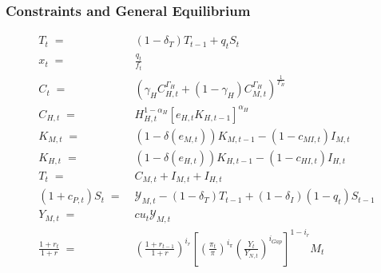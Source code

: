 \documentclass[12pt,3p,authoryear,review]{elsarticle}
\begin{document}
\subsubsection{Constraints and General Equilibrium}%
\vspace{-0.2in}%
\begin{small}%
	\begin{align}%
		T_t \; = & \; \left(1-\delta_T\right) T_{t-1} + q_t S_t\\%
		x_t \; = & \; \frac{q_t}{f_t}\\%
		C_t \; = & \; \left( \gamma_H C_{H,t}^{\Gamma_H} + \left(1-\gamma_H\right) C_{M,t}^{\Gamma_H} \right)^{\frac{1}{\Gamma_H}}\\%
		C_{H,t} \; = & \; H_{H,t}^{1-\alpha_H} \left[ e_{H,t} K_{H,t-1} \right]^{\alpha_H}\\%
		K_{M,t} \; = & \; \left(1-\delta\left(e_{M,t}\right)\right) K_{M,t-1} - \left(1-c_{MI,t}\right) I_{M,t}\\%
		K_{H,t} \; = & \; \left(1-\delta\left(e_{H,t}\right)\right) K_{H,t-1} - \left(1-c_{HI,t}\right) I_{H,t}\\%
		T_t \; = & \; C_{M,t} + I_{M,t} + I_{H,t}\\%
		\left(1+c_{P,t}\right) S_t \; = & \; \mathcal{Y}_{M,t} - \left(1-\delta_T\right) T_{t-1} + \left(1-\delta_I\right) \left(1-q_t\right) S_{t-1}\\%
		Y_{M,t} \; = & \; cu_t \mathcal{Y}_{M,t}\\%
		\frac{1+r_t}{1+r} \; = & \; \left(\frac{1+r_{t-1}}{1+r}\right)^{i_r} \left[ \left(\frac{\pi_t}{\pi}\right)^{i_\pi} \left(\frac{Y_t}{Y_{N,t}}\right)^{i_{Gap}} \right]^{1-i_r} M_t%
	\end{align}%
\end{small}%
\end{document}

